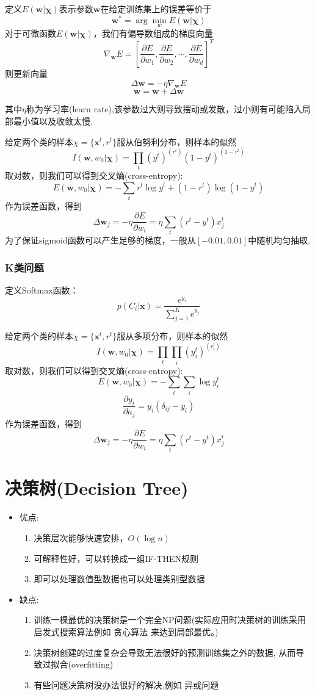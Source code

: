 \documentclass[11pt]{article}
\begin{document}
		定义$E(\mathbf{w} | \mathbf{\chi})$表示参数$\mathbf{w}$在给定训练集上的误差等价于
		\[\mathbf{w}^* = \arg\min_w E(\mathbf{w} | \mathbf{\chi})\]
		对于可微函数$E(\mathbf{w} | \mathbf{\chi})$，我们有偏导数组成的梯度向量
		\[\nabla_{\mathbf{w}}E = [\frac{\partial E}{\partial w_1}, \frac{\partial E}{\partial w_2}, \cdots, \frac{\partial E}{\partial w_d}]^T\]
		则更新向量
		\[\Delta \mathbf{w} = -\eta \nabla_{\mathbf{w}}E\]
		\[\mathbf{w} = \mathbf{w} + \Delta \mathbf{w}\]
		
		其中$\eta$称为学习率(learn rate),该参数过大则导致摆动或发散，过小则有可能陷入局部最小值以及收敛太慢.
		
		给定两个类的样本$\chi = \{\mathbf{x}^t, r^t\}$服从伯努利分布，则样本的似然
		\[I(\mathbf{w}, w_0 | \mathbf{\chi}) = \prod_t (y^t)^{(r^t)}(1 - y^t)^{(1 - r^t)}\]
		取对数，则我们可以得到交叉熵(cross-entropy):
		\[E(\mathbf{w}, w_0 | \mathbf{\chi}) = -\sum_t r^t\log y^t + (1 - r^t)\log(1 - y^t)\]
		作为误差函数，得到
		\[\Delta \mathbf{w}_j = -\eta\frac{\partial E}{\partial w_i} = \eta \sum_t (r^t - y^t)x^t_j \]
		为了保证sigmoid函数可以产生足够的梯度，一般从$[-0.01, 0.01]$中随机均匀抽取.
		
	\subsubsection{K类问题}
		定义Softmax函数：
			\[p(C_i | \mathbf{x}) = \frac{e^{y_i}}{\sum_{j = 1}^K e^{y_j}}\]
		
		
		
		给定两个类的样本$\chi = \{\mathbf{x}^t, r^t\}$服从多项分布，则样本的似然
		\[I(\mathbf{w}, w_0 | \mathbf{\chi}) = \prod_t \prod_i(y_i^t)^{(r_i^t)}\]
		取对数，则我们可以得到交叉熵(cross-entropy):
		\[E(\mathbf{w}, w_0 | \mathbf{\chi}) = -\sum_t \sum_i \log y_i^t\]
		\[\frac{\partial y_i}{\partial a_j} = y_i(\delta_{ij} - y_i)\]
		作为误差函数，得到
		\[\Delta \mathbf{w}_j = -\eta\frac{\partial E}{\partial w_i} = \eta \sum_t (r^t - y^t)x^t_j \]
\section{决策树(Decision Tree)}
	\begin{itemize}
		\item 优点: \begin{enumerate}
						\item 决策层次能够快速安排，$O(\log n)$
						\item 可解释性好，可以转换成一组IF-THEN规则 
						\item 即可以处理数值型数据也可以处理类别型数据
					\end{enumerate}
		\item 缺点: \begin{enumerate}
						\item 训练一棵最优的决策树是一个完全NP问题(实际应用时决策树的训练采用启发式搜索算法例如 贪心算法 来达到局部最优。)
						\item 决策树创建的过度复杂会导致无法很好的预测训练集之外的数据, 从而导致过拟合(overfitting)
						\item 有些问题决策树没办法很好的解决,例如 异或问题
					\end{enumerate}
	\end{itemize}
\end{document}
